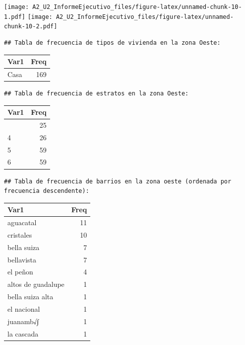 \documentclass[
]{article}
\begin{document}
\texttt{[image: A2\_U2\_InformeEjecutivo\_files/figure-latex/unnamed-chunk-10-1.pdf]}
\texttt{[image: A2\_U2\_InformeEjecutivo\_files/figure-latex/unnamed-chunk-10-2.pdf]}

\begin{verbatim}
## Tabla de frecuencia de tipos de vivienda en la zona Oeste:
\end{verbatim}

\begin{longtable}[]{@{}lr@{}}
\toprule\noalign{}
Var1 & Freq \\
\midrule\noalign{}
\endhead
\bottomrule\noalign{}
\endlastfoot
Casa & 169 \\
\end{longtable}

\begin{verbatim}
## Tabla de frecuencia de estratos en la zona Oeste:
\end{verbatim}

\begin{longtable}[]{@{}lr@{}}
\toprule\noalign{}
Var1 & Freq \\
\midrule\noalign{}
\endhead
\bottomrule\noalign{}
\endlastfoot
3 & 25 \\
4 & 26 \\
5 & 59 \\
6 & 59 \\
\end{longtable}

\begin{verbatim}
## Tabla de frecuencia de barrios en la zona oeste (ordenada por frecuencia descendente):
\end{verbatim}

\begin{longtable}[]{@{}lr@{}}
\toprule\noalign{}
Var1 & Freq \\
\midrule\noalign{}
\endhead
\bottomrule\noalign{}
\endlastfoot
aguacatal & 11 \\
cristales & 10 \\
bella suiza & 7 \\
bellavista & 7 \\
el peñon & 4 \\
altos de guadalupe & 1 \\
bella suiza alta & 1 \\
el nacional & 1 \\
juanamb√∫ & 1 \\
la cascada & 1 \\
\end{longtable}
\end{document}
